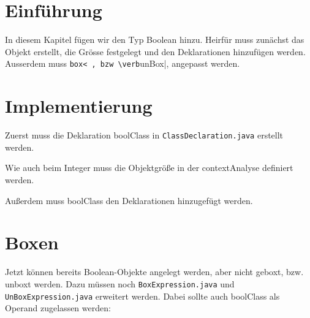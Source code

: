 \section{Einführung}
In diesem Kapitel fügen wir den Typ Boolean hinzu.
Heirfür muss zunächst das Objekt erstellt, die Grösse festgelegt und  den Deklarationen hinzufügen werden.
Ausserdem muss \verb|box< , bzw \verb|unBox|, angepasst werden.

\section{Implementierung}
Zuerst muss die Deklaration boolClass in \verb|ClassDeclaration.java| erstellt werden.

Wie auch beim Integer muss die Objektgröße in der contextAnalyse definiert werden.

 Außerdem muss boolClass den Deklarationen hinzugefügt werden.

\section{Boxen}
Jetzt können bereits Boolean-Objekte angelegt werden, aber nicht geboxt, bzw. unboxt werden.
Dazu müssen noch \verb|BoxExpression.java| und \verb|UnBoxExpression.java| erweitert werden. Dabei sollte auch boolClass als Operand zugelassen werden:



